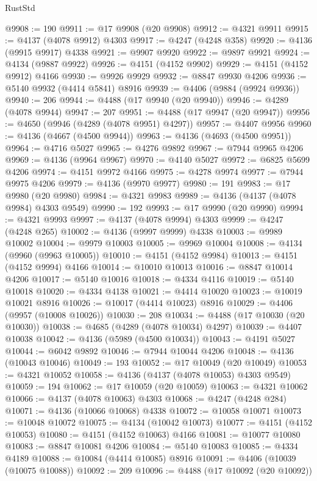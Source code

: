 \begin{lexlean}{RustStd}
\begin{coremodule}
@9908 := 190
@9911 := @17 @9908 (@20 @9908)
@9912 := @4321 @9911
@9915 := @4137 (@4078 @9912) @4303
@9917 := @4247 (@4248 @358)
@9920 := @4136 (@9915 @9917) @4338
@9921 := @9907 @9920
@9922 := @9897 @9921
@9924 := @4134 (@9887 @9922)
@9926 := @4151 (@4152 @9902)
@9929 := @4151 (@4152 @9912) @4166
@9930 := @9926 @9929
@9932 := @8847 @9930 @4206
@9936 := @5140 @9932 (@4414 @5841) @8916
@9939 := @4406 (@9884 (@9924 @9936))
@9940 := 206
@9944 := @4488 (@17 @9940 (@20 @9940))
@9946 := @4289 (@4078 @9944)
@9947 := 207
@9951 := @4488 (@17 @9947 (@20 @9947))
@9956 := @4650 (@9946 (@4289 (@4078 @9951) @4297))
@9957 := @4407 @9956
@9960 := @4136 (@4667 (@4500 @9944))
@9963 := @4136 (@4693 (@4500 @9951))
@9964 := @4716 @5027
@9965 := @4276 @9892
@9967 := @7944 @9965 @4206
@9969 := @4136 (@9964 @9967)
@9970 := @4140 @5027
@9972 := @6825 @5699 @4206
@9974 := @4151 @9972 @4166
@9975 := @4278 @9974
@9977 := @7944 @9975 @4206
@9979 := @4136 (@9970 @9977)
@9980 := 191
@9983 := @17 @9980 (@20 @9980)
@9984 := @4321 @9983
@9989 := @4136 (@4137 (@4078 @9984) @4303 @9549)
@9990 := 192
@9993 := @17 @9990 (@20 @9990)
@9994 := @4321 @9993
@9997 := @4137 (@4078 @9994) @4303
@9999 := @4247 (@4248 @265)
@10002 := @4136 (@9997 @9999) @4338
@10003 := @9989 @10002
@10004 := @9979 @10003
@10005 := @9969 @10004
@10008 := @4134 (@9960 (@9963 @10005))
@10010 := @4151 (@4152 @9984)
@10013 := @4151 (@4152 @9994) @4166
@10014 := @10010 @10013
@10016 := @8847 @10014 @4206
@10017 := @5140 @10016
@10018 := @4334 @4116
@10019 := @5140 @10018
@10020 := @4334 @4138
@10021 := @4414 @10020
@10023 := @10019 @10021 @8916
@10026 := @10017 (@4414 @10023) @8916
@10029 := @4406 (@9957 (@10008 @10026))
@10030 := 208
@10034 := @4488 (@17 @10030 (@20 @10030))
@10038 := @4685 (@4289 (@4078 @10034) @4297)
@10039 := @4407 @10038
@10042 := @4136 (@5989 (@4500 @10034))
@10043 := @4191 @5027
@10044 := @6042 @9892
@10046 := @7944 @10044 @4206
@10048 := @4136 (@10043 @10046)
@10049 := 193
@10052 := @17 @10049 (@20 @10049)
@10053 := @4321 @10052
@10058 := @4136 (@4137 (@4078 @10053) @4303 @9549)
@10059 := 194
@10062 := @17 @10059 (@20 @10059)
@10063 := @4321 @10062
@10066 := @4137 (@4078 @10063) @4303
@10068 := @4247 (@4248 @284)
@10071 := @4136 (@10066 @10068) @4338
@10072 := @10058 @10071
@10073 := @10048 @10072
@10075 := @4134 (@10042 @10073)
@10077 := @4151 (@4152 @10053)
@10080 := @4151 (@4152 @10063) @4166
@10081 := @10077 @10080
@10083 := @8847 @10081 @4206
@10084 := @5140 @10083
@10085 := @4334 @4189
@10088 := @10084 (@4414 @10085) @8916
@10091 := @4406 (@10039 (@10075 @10088))
@10092 := 209
@10096 := @4488 (@17 @10092 (@20 @10092))

\end{coremodule}
\end{lexlean}
